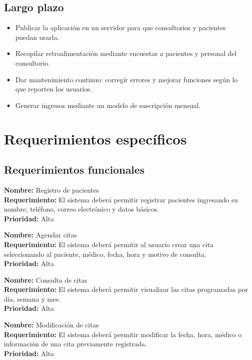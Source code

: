 \documentclass[12pt,a4paper]{article}
\begin{document}
\subsection{Largo plazo}
\begin{itemize}
    \item Publicar la aplicación en un servidor para que consultorios y pacientes puedan usarla.
    \item Recopilar retroalimentación mediante encuestas a pacientes y personal del consultorio.
    \item Dar mantenimiento continuo: corregir errores y mejorar funciones según lo que reporten los usuarios.
    \item Generar ingresos mediante un modelo de suscripción mensual.
\end{itemize}

\section{Requerimientos específicos}

\subsection{Requerimientos funcionales}

\noindent\textbf{Nombre:} Registro de pacientes \\
\textbf{Requerimiento:} El sistema deberá permitir registrar pacientes ingresando su nombre, teléfono, correo electrónico y datos básicos. \\
\textbf{Prioridad:} Alta
\bigskip

\noindent\textbf{Nombre:} Agendar citas \\
\textbf{Requerimiento:} El sistema deberá permitir al usuario crear una cita seleccionando al paciente, médico, fecha, hora y motivo de consulta. \\
\textbf{Prioridad:} Alta
\bigskip

\noindent\textbf{Nombre:} Consulta de citas \\
\textbf{Requerimiento:} El sistema deberá permitir visualizar las citas programadas por día, semana y mes. \\
\textbf{Prioridad:} Alta
\bigskip

\noindent\textbf{Nombre:} Modificación de citas \\
\textbf{Requerimiento:} El sistema deberá permitir modificar la fecha, hora, médico o información de una cita previamente registrada. \\
\textbf{Prioridad:} Alta
\bigskip
\end{document}
